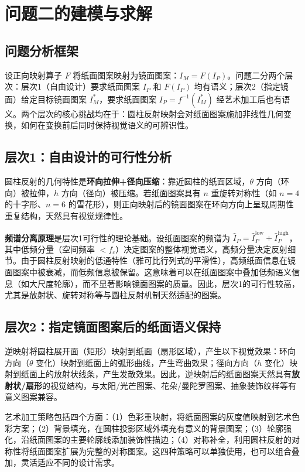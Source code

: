 \section{问题二的建模与求解}

\subsection{问题分析框架}

设正向映射算子 $F$ 将纸面图案映射为镜面图案：$I_M = F(I_P)$。问题二分两个层次：层次1（自由设计）要求纸面图案 $I_P$ 和 $F(I_P)$ 均有语义；层次2（指定镜面）给定目标镜面图案 $I_M^*$，要求纸面图案 $I_P = f^{-1}(I_M^*)$ 经艺术加工后也有语义。两个层次的核心挑战均在于：圆柱反射映射会对纸面图案施加非线性几何变换，如何在变换前后同时保持视觉语义的可辨识性。

\subsection{层次1：自由设计的可行性分析}

圆柱反射的几何特性是\textbf{环向拉伸+径向压缩}：靠近圆柱的纸面区域，$\theta$ 方向（环向）被拉伸，$h$ 方向（径向）被压缩。若纸面图案具有 $n$ 重旋转对称性（如 $n=4$ 的十字形、$n=6$ 的雪花形），则正向映射后的镜面图案在环向方向上呈现周期性重复结构，天然具有视觉规律性。

\textbf{频谱分离原理}是层次1可行性的理论基础\cite{mallat_wavelet_2009,gonzalez_digital_2018}。设纸面图案的频谱为 $\hat{I}_P = \hat{I}_P^{\text{low}} + \hat{I}_P^{\text{high}}$，其中低频分量（空间频率 $< f_c$）决定图案的整体视觉语义，高频分量决定反射细节。由于圆柱反射映射的低通特性（雅可比行列式的平滑性），高频纸面信息在镜面图案中被衰减，而低频信息被保留。这意味着可以在纸面图案中叠加低频语义信息（如大尺度轮廓），而不显著影响镜面图案的质量。因此，层次1的可行性较高，尤其是放射状、旋转对称等与圆柱反射机制天然适配的图案。

\subsection{层次2：指定镜面图案后的纸面语义保持}

逆映射将圆柱展开面（矩形）映射到纸面（扇形区域），产生以下视觉效果：环向方向（$\theta$ 变化）映射到纸面上的弧形曲线，产生弯曲效果；径向方向（$h$ 变化）映射到纸面上的放射状线条，产生发散效果。因此，逆映射后的纸面图案天然具有\textbf{放射状/扇形}的视觉结构，与太阳/光芒图案、花朵/曼陀罗图案、抽象装饰纹样等有意义图案兼容。

艺术加工策略包括四个方面：（1）色彩重映射，将纸面图案的灰度值映射到艺术色彩方案；（2）背景填充，在圆柱投影区域外填充有意义的背景图案；（3）轮廓强化，沿纸面图案的主要轮廓线添加装饰性描边；（4）对称补全，利用圆柱反射的对称性将纸面图案扩展为完整的对称图案。这四种策略可以单独使用，也可以组合叠加，灵活适应不同的设计需求。


